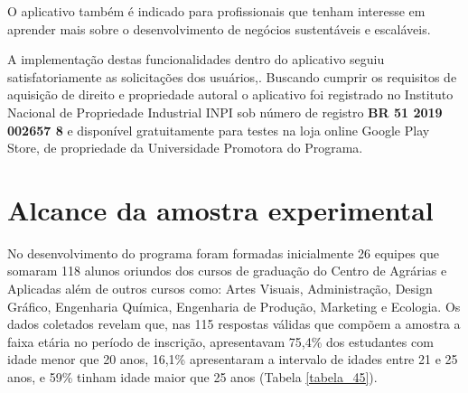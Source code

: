 O aplicativo também é indicado para profissionais que tenham interesse em aprender mais sobre o desenvolvimento de negócios sustentáveis e escaláveis.

A implementação destas funcionalidades dentro do aplicativo seguiu satisfatoriamente as solicitações dos usuários,.
Buscando cumprir os requisitos de aquisição de direito e propriedade autoral o aplicativo foi registrado no Instituto Nacional de Propriedade Industrial INPI sob número de registro \textbf{BR 51 2019 002657 8} e disponível gratuitamente para testes na loja online Google Play Store, de propriedade da Universidade Promotora do Programa.

\section{Alcance da amostra experimental}

No desenvolvimento do programa foram formadas inicialmente 26 equipes que somaram 118 alunos oriundos dos cursos de graduação do Centro de Agrárias e Aplicadas além de outros cursos como: Artes Visuais, Administração, Design Gráfico, Engenharia Química, Engenharia de Produção, Marketing e Ecologia.
Os dados coletados revelam que, nas 115 respostas válidas que compõem a amostra a faixa etária no período de inscrição, apresentavam 75,4\% dos estudantes com idade menor que 20 anos, 16,1\% apresentaram a intervalo de idades entre 21 e 25 anos, e 59\% tinham idade maior que 25 anos (Tabela \ref{tabela_45}).
 

